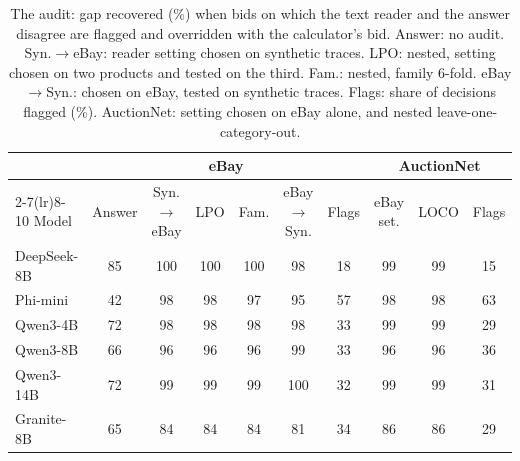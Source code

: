 \begin{table}[t]
\caption{The audit: gap recovered (\%) when bids on which the text reader and the answer disagree are flagged and overridden with the calculator's bid. Answer: no audit. Syn.$\to$eBay: reader setting chosen on synthetic traces. LPO: nested, setting chosen on two products and tested on the third. Fam.: nested, family 6-fold. eBay$\to$Syn.: chosen on eBay, tested on synthetic traces. Flags: share of decisions flagged (\%). AuctionNet: setting chosen on eBay alone, and nested leave-one-category-out.}
\label{tab:audit}
\footnotesize
\centering

\begin{tabular}{lccccccccc}
\toprule
& \multicolumn{6}{c}{eBay} & \multicolumn{3}{c}{AuctionNet} \\ \cmidrule(lr){2-7}\cmidrule(lr){8-10} Model & Answer & Syn.$\to$eBay & LPO & Fam. & eBay$\to$Syn. & Flags & eBay set. & LOCO & Flags \\
\midrule
DeepSeek-8B & 85 & 100 & 100 & 100 & 98 & 18 & 99 & 99 & 15 \\
Phi-mini & 42 & 98 & 98 & 97 & 95 & 57 & 98 & 98 & 63 \\
Qwen3-4B & 72 & 98 & 98 & 98 & 98 & 33 & 99 & 99 & 29 \\
Qwen3-8B & 66 & 96 & 96 & 96 & 99 & 33 & 96 & 96 & 36 \\
Qwen3-14B & 72 & 99 & 99 & 99 & 100 & 32 & 99 & 99 & 31 \\
Granite-8B & 65 & 84 & 84 & 84 & 81 & 34 & 86 & 86 & 29 \\
\bottomrule
\end{tabular}
\end{table}
